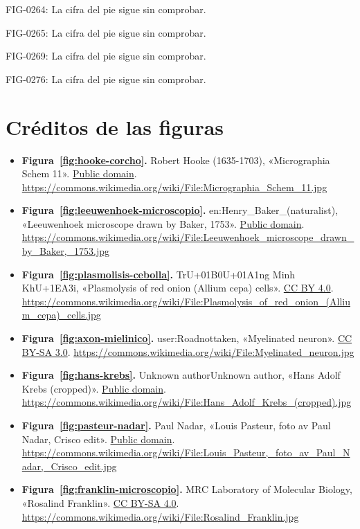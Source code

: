 \documentclass{book}
\begin{document}
\noindent FIG-0264: La cifra del pie sigue sin comprobar.

\noindent FIG-0265: La cifra del pie sigue sin comprobar.

\noindent FIG-0269: La cifra del pie sigue sin comprobar.

\noindent FIG-0276: La cifra del pie sigue sin comprobar.
\chapter*{Créditos de las figuras}
\begin{itemize}
\item \textbf{Figura~\ref{fig:hooke-corcho}.} Robert Hooke (1635-1703), «Micrographia Schem 11». \href{https://creativecommons.org/publicdomain/mark/1.0/}{Public domain}. \url{https://commons.wikimedia.org/wiki/File:Micrographia_Schem_11.jpg}
\item \textbf{Figura~\ref{fig:leeuwenhoek-microscopio}.} en:Henry\_Baker\_(naturalist), «Leeuwenhoek microscope drawn by Baker, 1753». \href{https://creativecommons.org/publicdomain/mark/1.0/}{Public domain}. \url{https://commons.wikimedia.org/wiki/File:Leeuwenhoek_microscope_drawn_by_Baker,_1753.jpg}
\item \textbf{Figura~\ref{fig:plasmolisis-cebolla}.} Tr{U+01B0}{U+01A1}ng Minh Kh{U+1EA3}i, «Plasmolysis of red onion (Allium cepa) cells». \href{https://creativecommons.org/licenses/by/4.0/}{CC BY 4.0}. \url{https://commons.wikimedia.org/wiki/File:Plasmolysis_of_red_onion_(Allium_cepa)_cells.jpg}
\item \textbf{Figura~\ref{fig:axon-mielinico}.} user:Roadnottaken, «Myelinated neuron». \href{https://creativecommons.org/licenses/by-sa/3.0/}{CC BY-SA 3.0}. \url{https://commons.wikimedia.org/wiki/File:Myelinated_neuron.jpg}
\item \textbf{Figura~\ref{fig:hans-krebs}.} Unknown authorUnknown author, «Hans Adolf Krebs (cropped)». \href{https://creativecommons.org/publicdomain/mark/1.0/}{Public domain}. \url{https://commons.wikimedia.org/wiki/File:Hans_Adolf_Krebs_(cropped).jpg}
\item \textbf{Figura~\ref{fig:pasteur-nadar}.} Paul Nadar, «Louis Pasteur, foto av Paul Nadar, Crisco edit». \href{https://creativecommons.org/publicdomain/mark/1.0/}{Public domain}. \url{https://commons.wikimedia.org/wiki/File:Louis_Pasteur,_foto_av_Paul_Nadar,_Crisco_edit.jpg}
\item \textbf{Figura~\ref{fig:franklin-microscopio}.} MRC Laboratory of Molecular Biology, «Rosalind Franklin». \href{https://creativecommons.org/licenses/by-sa/4.0/}{CC BY-SA 4.0}. \url{https://commons.wikimedia.org/wiki/File:Rosalind_Franklin.jpg}

\end{itemize}
\end{document}
